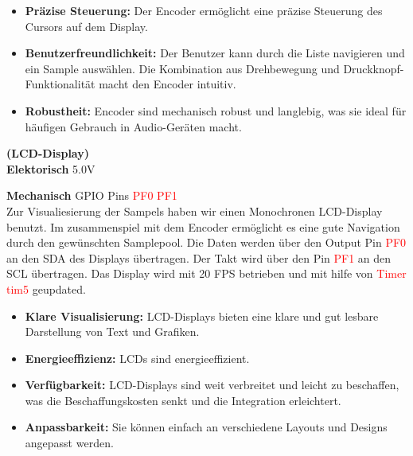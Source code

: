 \begin{itemize}
    \item \textbf{Präzise Steuerung:} Der Encoder ermöglicht eine präzise Steuerung des Cursors auf dem Display.
    
    \item \textbf{Benutzerfreundlichkeit:} Der Benutzer kann durch die Liste navigieren und ein Sample auswählen. Die Kombination aus Drehbewegung und Druckknopf-Funktionalität macht den Encoder intuitiv.
    
    \item \textbf{Robustheit:} Encoder sind mechanisch robust und langlebig, was sie ideal für häufigen Gebrauch in Audio-Geräten macht.
\end{itemize}





\textbf{(LCD-Display)} \\

\textbf{Elektorisch} 5.0V

\textbf{Mechanisch} GPIO Pins  \textcolor{red}{PF0 PF1} \\

Zur Visualiesierung der Sampels haben wir einen Monochronen LCD-Display benutzt. Im zusammenspiel mit dem Encoder ermöglicht es eine gute Navigation durch den gewünschten Samplepool. Die Daten werden über den Output Pin  \textcolor{red}{PF0} an den SDA des Displays übertragen. Der Takt wird über den Pin  \textcolor{red}{PF1} an den SCL übertragen. Das Display wird mit 20 FPS betrieben und mit hilfe von \textcolor{red}{Timer tim5} geupdated.

\begin{itemize}
    \item \textbf{Klare Visualisierung:} LCD-Displays bieten eine klare und gut lesbare Darstellung von Text und Grafiken.
    
    \item \textbf{Energieeffizienz:} LCDs sind energieeffizient.
    
    \item \textbf{Verfügbarkeit:} LCD-Displays sind weit verbreitet und leicht zu beschaffen, was die Beschaffungskosten senkt und die Integration erleichtert.
    
    \item \textbf{Anpassbarkeit:} Sie können einfach an verschiedene Layouts und Designs angepasst werden.
\end{itemize}


